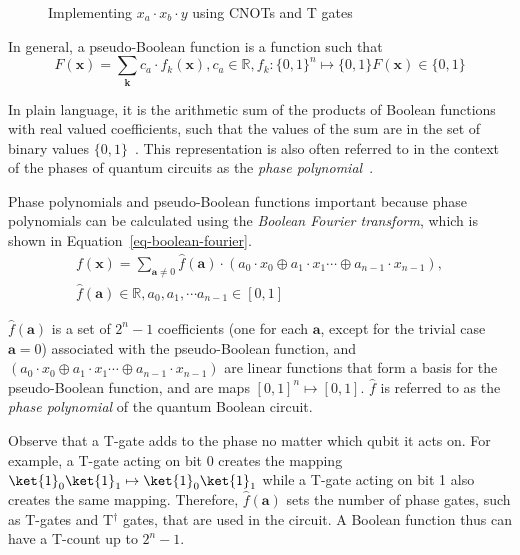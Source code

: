 \begin{figure*}[t]
  \centering
  \scalebox{0.8} {
    
  }
  \caption{Implementing $x_a \cdot x_b \cdot y$ using CNOTs and T gates}
  \label{fig-toff-mark}
\end{figure*}


In general, a pseudo-Boolean function is a function such that
\begin{equation}
  \label{eq-pseudo-boolean}
  F(\mathbf{x}) = \sum_{\mathbf{k}} c_a \cdot f_k(\mathbf{x}), c_a \in \mathbb{R}, f_k : \{0,1\}^n \mapsto \{0,1\}
  F(\mathbf{x}) \in \{0,1\}
\end{equation}

In plain language, it is the arithmetic sum of the products of Boolean functions with real valued coefficients, such that
the values of the sum are in the set of binary values $\{0,1\}$~\cite{bib-barenco-elementary}. This
representation is also often referred to in the context of the phases of quantum circuits as the
{\it phase polynomial}~\cite{bib-amy-cnot}.

Phase polynomials and pseudo-Boolean functions important because phase polynomials can be calculated
using the {\it Boolean Fourier transform}, which is shown in Equation~\ref{eq-boolean-fourier}.
\begin{equation}
  \label{eq-boolean-fourier}
  \begin{aligned}
    f(\mathbf{x}) = \sum_{\mathbf{a} \neq 0} \hat{f}(\mathbf{a}) \cdot ( a_0 \cdot x_0 \oplus a_1 \cdot x_1 \cdots \oplus a_{n-1} \cdot x_{n-1}),\\\nonumber
    \hat{f}(\mathbf{a}) \in \mathbb{R} , a_0,a_1,\cdots a_{n-1} \in [0,1]
  \end{aligned}
\end{equation}

$\hat{f}(\mathbf{a})$ is a set of $2^{n}-1$ coefficients (one for each $\mathbf{a}$, except for the trivial
case $\mathbf{a} = 0$) associated with the pseudo-Boolean function, and
$( a_0 \cdot x_0 \oplus a_1 \cdot x_1 \cdots \oplus a_{n-1} \cdot x_{n-1}) $ are linear functions
that form a basis for the pseudo-Boolean function, and are maps $[0,1]^n \mapsto [0,1]$. $\hat{f}$ is referred to
as the {\it phase polynomial} of the quantum Boolean circuit.

Observe that a T-gate adds to the phase no matter which qubit it acts on.
For example, a T-gate acting on bit 0 creates the mapping $\ket{1}_0\ket{1}_1 \mapsto \ket{1}_0\ket{1}_1$ while
a T-gate acting on bit 1 also creates the same mapping. Therefore, $\hat{f}(\mathbf{a})$ sets the number of
phase gates, such as T-gates and T$^{\dagger}$ gates, that are used in the circuit. A Boolean function thus can
have a T-count up to $2^{n}-1$.

